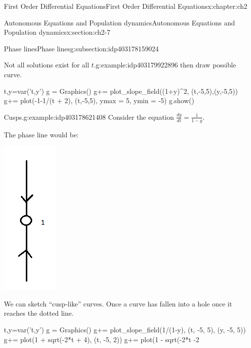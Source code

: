 \documentclass[oneside,10pt,]{book}
\numberwithin{equation}{section}
\numberwithin{equation}{section}
\begin{document}
\begin{chapterptx}{First Order Differential Equations}{}{First Order Differential Equations}{}{}{x:chapter:ch2}
\begin{sectionptx}{Autonomous Equations and Population dynamics}{}{Autonomous Equations and Population dynamics}{}{}{x:section:ch2-7}
\begin{subsectionptx}{Phase lines}{}{Phase lines}{}{}{g:subsection:idp403178159024}
\begin{example}{Not all solutions exist for all \(t\).}{g:example:idp403179922896}
then draw possible curve.%
\begin{sageinput}
t,y=var('t,y')
g = Graphics()
g+= plot_slope_field((1+y)^2, (t,-5,5),(y,-5,5))
g+= plot(-1-1/(t + 2), (t,-5,5), ymax = 5, ymin = -5)
g.show()
\end{sageinput}
\end{example}
\begin{example}{Cusps.}{g:example:idp403178621408}%
Consider the equation \(\frac{dy}{dt}=\frac{1}{1-y}\).%
\par
The phase line would be: \begin{image}{0}{1}{0}%
\includegraphics[width=\linewidth]{images/1.6-Phase3.png}
\end{image}%
 We can sketch ``cusp-like'' curves. Once a curve has fallen into a hole once it reaches the dotted line.%
\begin{sageinput}
t,y=var('t,y')
g = Graphics()
g+= plot_slope_field(1/(1-y), (t, -5, 5), (y, -5, 5))
g+= plot(1 + sqrt(-2*t + 4), (t, -5, 2))
g+= plot(1 - sqrt(-2*t -2
\end{sageinput}
\end{example}
\end{subsectionptx}
\end{sectionptx}
\end{chapterptx}
\end{document}
